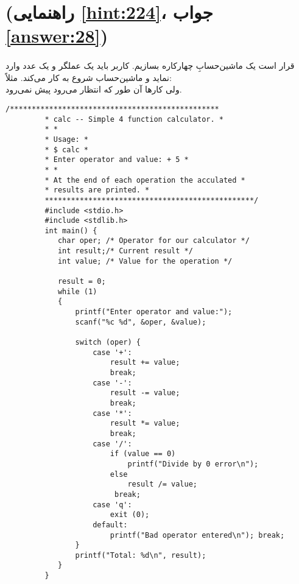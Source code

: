 \section[ناهمگام]{ \protect{} (راهنمایی \ref{hint:224}، جواب \ref{answer:28})}
\paragraph{}\label{prog:71}
قرار است یک ماشین‌حسابِ چهارکاره بسازیم. کاربر باید یک عملگر و یک عدد وارد نماید و ماشین‌حساب شروع به کار می‌کند. مثلاً:
\LTR\noindent
{}\\
\RTL
ولی کارها آن طور که انتظار می‌رود پیش نمی‌رود.

\begin{LTR}
    \begin{lstlisting}[style=C++Style]
         /************************************************
         * calc -- Simple 4 function calculator. *
         * *
         * Usage: *
         * $ calc *
         * Enter operator and value: + 5 *
         * *
         * At the end of each operation the acculated *
         * results are printed. *
         ************************************************/
         #include <stdio.h>
         #include <stdlib.h>
         int main() {
         	char oper; /* Operator for our calculator */
         	int result;/* Current result */
         	int value; /* Value for the operation */

         	result = 0;
         	while (1)
         	{
         		printf("Enter operator and value:");
         		scanf("%c %d", &oper, &value);

         		switch (oper) {
         			case '+':
         				result += value;
         				break;
         			case '-':
         				result -= value;
         				break;
         			case '*':
         				result *= value;
         				break;
         			case '/':
         				if (value == 0)
         					printf("Divide by 0 error\n");
         				else
         					result /= value;
        				 break;
         			case 'q':
         				exit (0);
         			default:
         				printf("Bad operator entered\n"); break;
         		}
         		printf("Total: %d\n", result);
         	}
         }
    \end{lstlisting}
\end{LTR}